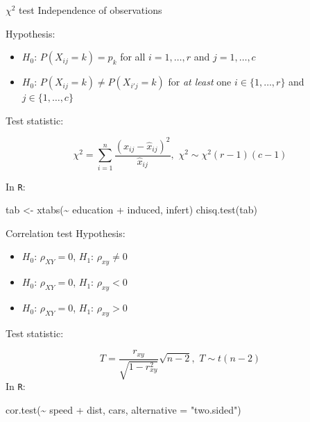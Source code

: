 \documentclass[
  ignorenonframetext,
]{beamer}
\newenvironment{Shaded}{\begin{snugshade}}{\end{snugshade}}
\newcommand{\AttributeTok}[1]{\textcolor[rgb]{0.00,0.34,0.68}{#1}}
\newcommand{\FunctionTok}[1]{\textcolor[rgb]{0.39,0.29,0.61}{#1}}
\newcommand{\NormalTok}[1]{\textcolor[rgb]{0.12,0.11,0.11}{#1}}
\newcommand{\OtherTok}[1]{\textcolor[rgb]{0.00,0.43,0.16}{#1}}
\newcommand{\SpecialCharTok}[1]{\textcolor[rgb]{0.24,0.68,0.91}{#1}}
\newcommand{\StringTok}[1]{\textcolor[rgb]{0.75,0.01,0.01}{#1}}
\providecommand{\tightlist}{%
  \setlength{\itemsep}{0pt}\setlength{\parskip}{0pt}}
\begin{document}
\begin{frame}[fragile]{\(\chi^2\) test}
\protect\hypertarget{chi2-test}{}
Independence of observations

Hypothesis:

\begin{itemize}
\item
  \(H_0\): \(P(X_{ij} = k) = p_k\) for all \(i=1, \ldots, r\) and
  \(j=1, \ldots, c\)
\item
  \(H_0\): \(P(X_{ij} = k) \neq P(X_{i'j} = k)\) for \emph{at least} one
  \(i \in \{1, \ldots, r\}\) and \(j \in \{1, \ldots, c\}\)
\end{itemize}

Test statistic:

\[\chi^2 = \displaystyle \sum_{i=1}^{n}\frac{(x_{ij} - \hat{x}_{ij})^2}{\hat{x}_{ij}}, \, \, \chi^2 \sim \chi^2(r-1)(c-1)\]

In \texttt{R}:

\begin{Shaded}
\begin{Highlighting}[]
\NormalTok{tab }\OtherTok{\textless{}{-}} \FunctionTok{xtabs}\NormalTok{(}\SpecialCharTok{\textasciitilde{}}\NormalTok{ education }\SpecialCharTok{+}\NormalTok{ induced, infert)}
\FunctionTok{chisq.test}\NormalTok{(tab)}
\end{Highlighting}
\end{Shaded}
\end{frame}

\begin{frame}[fragile]{Correlation test}
\protect\hypertarget{correlation-test}{}
Hypothesis:

\begin{itemize}
\tightlist
\item
  \(H_0\): \(\rho_{XY} = 0\), \(H_1\): \(\rho_{xy} \neq 0\)
\item
  \(H_0\): \(\rho_{XY} = 0\), \(H_1\): \(\rho_{xy} < 0\)
\item
  \(H_0\): \(\rho_{XY} = 0\), \(H_1\): \(\rho_{xy} >0\)
\end{itemize}

Test statistic:

\[T = \frac{r_{xy}}{\sqrt{1-r_{xy}^2}}\sqrt{n-2}, \, \, T \sim t(n-2)\]
In \texttt{R}:

\begin{Shaded}
\begin{Highlighting}[]
\FunctionTok{cor.test}\NormalTok{(}\SpecialCharTok{\textasciitilde{}}\NormalTok{ speed }\SpecialCharTok{+}\NormalTok{ dist, cars, }
         \AttributeTok{alternative =} \StringTok{"two.sided"}\NormalTok{)}
\end{Highlighting}
\end{Shaded}
\end{frame}
\end{document}
